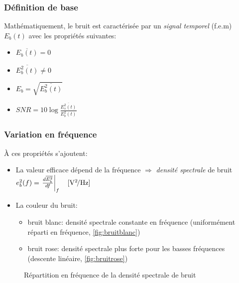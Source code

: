 \subsubsection{Définition de base}
Mathématiquement, le bruit est caractérisée par un \emph{signal temporel} (f.e.m) \(E_b(t)\) avec les propriétés suivantes:
\begin{itemize}
	\item { \(\overline{E_b(t)}=0\)}
	\item { \(\overline{E_b^2(t)} \neq 0\)}
	\item { \(E_b=\sqrt{\overline{E_b^2(t)}}\)}
	\item { \(SNR=10\log\frac{\overline{E^2_s(t)}}{E_b^2(t)}\)}
\end{itemize}
\subsubsection{Variation en fréquence}
À ces propriétés s'ajoutent:\begin{itemize}
	\item La valeur efficace dépend de la fréquence \(\Rightarrow\) \emph{densité spectrale} de bruit \(e_b^2(f)=\left.\frac{d\overline{E_b^2}}{df}\right|_f\quad [\si[per-mode=symbol]{\volt\squared\per\hertz}]\)
	\item La couleur du bruit:
	\begin{itemize}
		\item bruit blanc: densité spectrale constante en fréquence (uniformément réparti en fréquence, \autoref{fig:bruitblanc})
		\item bruit rose: densité spectrale plus forte pour les basses fréquences (descente linéaire, \autoref{fig:bruitrose})
	\end{itemize}
\end{itemize}
\begin{figure}[H]
	\centering
	\caption{Répartition en fréquence de la densité spectrale de bruit}
\end{figure}
